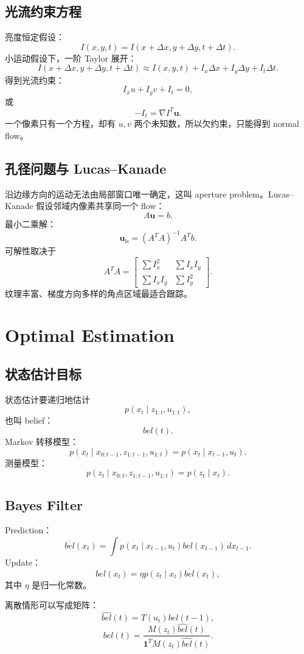 \documentclass[11pt]{article}
\begin{document}
\subsection{光流约束方程}

亮度恒定假设：
\[
  I(x,y,t)=I(x+\Delta x,y+\Delta y,t+\Delta t).
\]
小运动假设下，一阶 Taylor 展开：
\[
  I(x+\Delta x,y+\Delta y,t+\Delta t)
  \approx
  I(x,y,t)+I_x\Delta x+I_y\Delta y+I_t\Delta t.
\]
得到光流约束：
\[
  I_xu+I_yv+I_t=0,
\]
或
\[
  -I_t=\nabla I^T\bm u.
\]
一个像素只有一个方程，却有 $u,v$ 两个未知数，所以欠约束，只能得到 normal flow。

\subsection{孔径问题与 Lucas--Kanade}

沿边缘方向的运动无法由局部窗口唯一确定，这叫 aperture problem。Lucas--Kanade 假设邻域内像素共享同一个 flow：
\[
  A\bm u=b.
\]
最小二乘解：
\[
  \bm u_{\text{ls}}=(A^TA)^{-1}A^Tb.
\]
可解性取决于
\[
  A^TA=
  \begin{bmatrix}
    \sum I_x^2 & \sum I_xI_y\\
    \sum I_xI_y & \sum I_y^2
  \end{bmatrix}.
\]
纹理丰富、梯度方向多样的角点区域最适合跟踪。

\section{Optimal Estimation}

\subsection{状态估计目标}

状态估计要递归地估计
\[
  p(x_t\mid z_{1:t},u_{1:t}),
\]
也叫 belief：
\[
  bel(t).
\]
Markov 转移模型：
\[
  p(x_t\mid x_{0:t-1},z_{1:t-1},u_{1:t})
  =
  p(x_t\mid x_{t-1},u_t).
\]
测量模型：
\[
  p(z_t\mid x_{0:t},z_{1:t-1},u_{1:t})
  =
  p(z_t\mid x_t).
\]

\subsection{Bayes Filter}

Prediction：
\[
  \overline{bel}(x_t)
  =
  \int p(x_t\mid x_{t-1},u_t)bel(x_{t-1})\,dx_{t-1}.
\]
Update：
\[
  bel(x_t)=\eta p(z_t\mid x_t)\overline{bel}(x_t),
\]
其中 $\eta$ 是归一化常数。

离散情形可以写成矩阵：
\[
  \widehat{bel}(t)=T(u_t)bel(t-1),
\]
\[
  bel(t)=
  \frac{M(z_t)\widehat{bel}(t)}
  {\mathbf{1}^TM(z_t)\widehat{bel}(t)}.
\]
\end{document}
